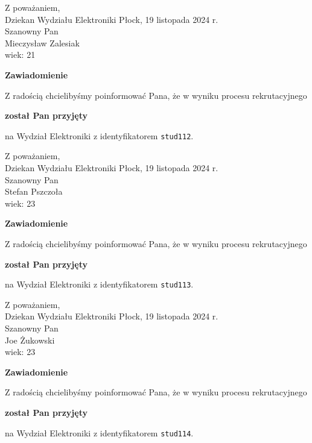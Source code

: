 \documentclass[12pt,a4paper]{article}
\begin{document}
\noindent
Z poważaniem,\\
Dziekan
Wydziału Elektroniki
\newpage
\hfill Płock, 19 listopada 2024 r.\\ 
\noindent 
Szanowny Pan \\
Mieczysław Zalesiak \\
wiek: 21

\bigskip

\begin{center}
{\Large\textbf{Zawiadomienie}}
\end{center}
\bigskip
Z radością chcielibyśmy poinformować Pana, że w wyniku procesu rekrutacyjnego
\begin{center}
\textsf{\textbf{został Pan przyjęty}} 
\end{center}
na Wydział Elektroniki z identyfikatorem \verb|stud112|.
\vspace{2cm}

\noindent
Z poważaniem,\\
Dziekan
Wydziału Elektroniki
\newpage
\hfill Płock, 19 listopada 2024 r.\\ 
\noindent 
Szanowny Pan \\
Stefan Pszczoła \\
wiek: 23

\bigskip

\begin{center}
{\Large\textbf{Zawiadomienie}}
\end{center}
\bigskip
Z radością chcielibyśmy poinformować Pana, że w wyniku procesu rekrutacyjnego
\begin{center}
\textsf{\textbf{został Pan przyjęty}} 
\end{center}
na Wydział Elektroniki z identyfikatorem \verb|stud113|.
\vspace{2cm}

\noindent
Z poważaniem,\\
Dziekan
Wydziału Elektroniki
\newpage
\hfill Płock, 19 listopada 2024 r.\\ 
\noindent 
Szanowny Pan \\
Joe Żukowski \\
wiek: 23

\bigskip

\begin{center}
{\Large\textbf{Zawiadomienie}}
\end{center}
\bigskip
Z radością chcielibyśmy poinformować Pana, że w wyniku procesu rekrutacyjnego
\begin{center}
\textsf{\textbf{został Pan przyjęty}} 
\end{center}
na Wydział Elektroniki z identyfikatorem \verb|stud114|.
\vspace{2cm}
\end{document}
